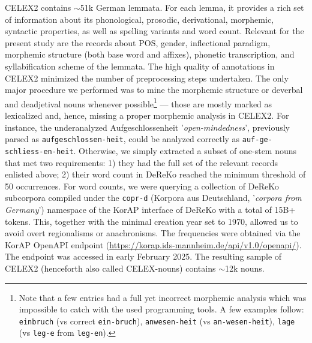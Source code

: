 \documentclass[10pt, a4paper]{article}
\begin{document}
CELEX2 contains $\sim$51k German lemmata. For each lemma, it provides a rich set of information about its phonological, prosodic, derivational, morphemic, syntactic properties, as well as spelling variants and word count. Relevant for the present study are the records about POS, gender, inflectional paradigm, morphemic structure (both base word and affixes), phonetic transcription, and syllabification scheme of the lemmata. The high quality of annotations in CELEX2 minimized the number of preprocessing steps undertaken. The only major procedure we performed was to mine the morphemic structure or deverbal and deadjetival nouns whenever possible\footnote{Note that a few entries had a full yet incorrect morphemic analysis which was impossible to catch with the used programming tools. A few examples follow: \mbox{\texttt{einbruch}} (vs correct \mbox{\texttt{ein-bruch}}), \mbox{\texttt{anwesen-heit}} (vs \mbox{\texttt{an-wesen-heit}}), \mbox{\texttt{lage}} (vs \mbox{\texttt{leg-e}} from \mbox{\texttt{leg-en}}).} --- those are mostly marked as lexicalized and, hence, missing a proper morphemic analysis in CELEX2. For instance, the underanalyzed Aufgeschlossenheit '\textit{open-mindedness}', previously parsed as \texttt{aufgeschlossen-heit}, could be analyzed correctly as \texttt{auf-ge-schliess-en-heit}. Otherwise, we simply extracted a subset of one-stem nouns that met two requirements: 1) they had the full set of the relevant records enlisted above; 2) their word count in DeReKo reached the minimum threshold of 50 occurrences. For word counts, we were querying a collection of DeReKo subcorpora compiled under the \texttt{copr-d} (Korpora aus Deutschland, '\textit{corpora from Germany}') namespace of the KorAP interface of DeReKo with a total of 15B+ tokens. This, together with the minimal creation year set to 1970, allowed us to avoid overt regionalisms or anachronisms. The frequencies were obtained via the KorAP OpenAPI endpoint (\url{https://korap.ids-mannheim.de/api/v1.0/openapi/}). The endpoint was accessed in early February 2025. The resulting sample of CELEX2 (henceforth also called CELEX-nouns) contains $\sim$12k nouns.
\end{document}
